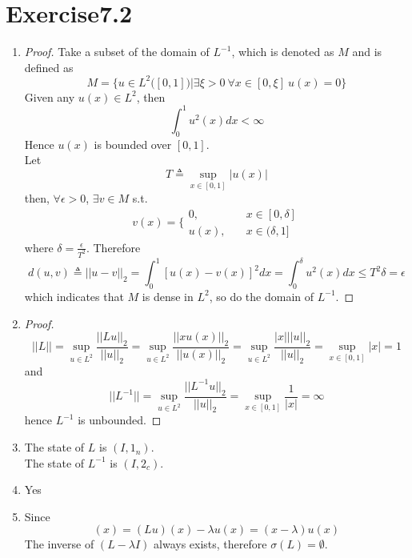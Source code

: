 \documentclass[paper=a4, fontsize=11pt]{scrartcl} %
\numberwithin{equation}{section} %
\numberwithin{figure}{section} %
\numberwithin{table}{section} %
\begin{document}
\section{Exercise7.2}
	\begin{enumerate}
		\item 
			\begin{proof}
				Take a subset of the domain of $L^{-1}$, which is denoted as $M$ and is defined as
				\begin{equation}
					M = \Big\{u \in L^2\big([0, 1]\big) \Big| \exists \xi >0 \  \forall x \in [0, \xi] \ u(x) = 0\Big\}
				\end{equation}
				Given any $u(x) \in L^2$, then
				\begin{equation}
					\int_{0}^{1} u^2(x) dx < \infty
				\end{equation}
				Hence $u(x)$ is bounded over $[0, 1]$. \\
				Let 
				\begin{equation}
					T \triangleq \sup \limits_{x\in [0, 1]} |u(x)|
				\end{equation}
				then, $\forall \epsilon > 0$, $\exists v \in M $ s.t.
				\begin{equation}
					v(x) = \Bigg\{\begin{aligned}
					0, &\quad x \in [0, \delta]\\
					u(x), &\quad x \in (\delta, 1]
					\end{aligned}
				\end{equation}
				where $\delta = \frac{\epsilon}{T^2}$. Therefore
				\begin{equation}
					d(u, v) \triangleq ||u-v||_2 = \int_{0}^{1} [u(x) - v(x)]^2 dx = \int_{0}^{\delta} u^2(x) dx \leq T^2 \delta = \epsilon
				\end{equation}
				which indicates that $M$ is dense in $L^2$, so do the domain of $L^{-1}$.
			\end{proof}
		\item 
			\begin{proof}
				\begin{equation}
					||L|| = \sup_{u\in L^2}\frac{||Lu||_2}{||u||_2} = \sup_{u\in L^2}\frac{||xu(x)||_2}{||u(x)||_2} = \sup_{u\in L^2}\frac{|x| ||u||_2}{||u||_2} = \sup_{x\in [0, 1]} |x| = 1
				\end{equation}
				and
				\begin{equation}
					||L^{-1}|| = \sup_{u\in L^2}\frac{||L^{-1}u||_2}{||u||_2} = \sup_{x\in [0, 1]} \frac{1}{|x|} = \infty
				\end{equation}
				hence $L^{-1}$ is unbounded.
			\end{proof}
		\item 
			The state of $L$ is $(I, 1_n)$.\\
			The state of $L^{-1}$ is $(I, 2_c)$.
		\item 
			Yes
		\item 
			Since
			\begin{equation}
				[(L - \lambda I)u] (x) = (Lu)(x) - \lambda u(x) = (x-\lambda) u(x)
			\end{equation}
			The inverse of $(L - \lambda I)$ always exists, therefore $\sigma(L) = \emptyset$.
	\end{enumerate}
\end{document}
